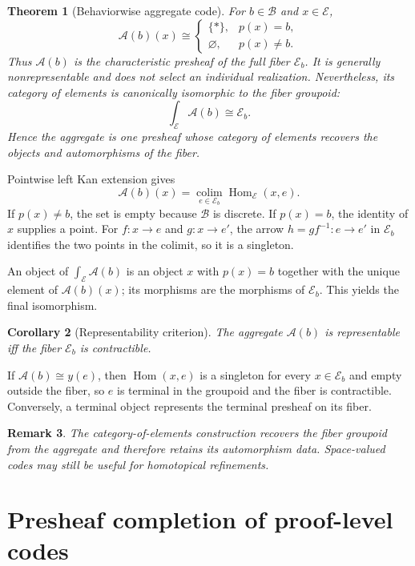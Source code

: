 \documentclass[12pt,a4paper,twoside]{extarticle}
\makeatletter
\theoremstyle{compactplain}
\newtheorem{theorem}{Theorem}[section]
\newtheorem{corollary}[theorem]{Corollary}
\theoremstyle{compactdef}
\newtheorem{remark}[theorem]{Remark}
\renewenvironment{proof}[1][\proofname]{\par\pushQED{\qed}\normalfont
  \topsep2pt\trivlist\item[\hskip\labelsep\bfseries #1\@addpunct{.}]\ignorespaces}
 {\popQED\endtrivlist\@endpefalse}
\newcommand{\Hom}{\operatorname{Hom}}
\newcommand{\colim}{\operatorname*{colim}}
\makeatother
\begin{document}
\begin{theorem}[Behaviorwise aggregate code]\label{thm:aggregate}
For $b\in\mathcal B$ and $x\in\mathcal E$,
\[
\mathcal A(b)(x)\cong
\begin{cases}
\{*\},&p(x)=b,\\
\varnothing,&p(x)\ne b.
\end{cases}
\]
Thus $\mathcal A(b)$ is the characteristic presheaf of the full fiber $\mathcal E_b$. It is generally nonrepresentable and does not select an individual realization. Nevertheless, its category of elements is canonically isomorphic to the fiber groupoid:
\[
\int_{\mathcal E}\mathcal A(b)\cong\mathcal E_b.
\]
Hence the aggregate is one presheaf whose category of elements recovers the objects and automorphisms of the fiber.
\end{theorem}
\begin{proof}
Pointwise left Kan extension gives
\[
\mathcal A(b)(x)=\colim_{e\in\mathcal E_b}\Hom_{\mathcal E}(x,e).
\]
If $p(x)\ne b$, the set is empty because $\mathcal B$ is discrete. If $p(x)=b$, the identity of $x$ supplies a point. For $f:x\to e$ and $g:x\to e'$, the arrow $h=gf^{-1}:e\to e'$ in $\mathcal E_b$ identifies the two points in the colimit, so it is a singleton.

An object of $\int_{\mathcal E}\mathcal A(b)$ is an object $x$ with $p(x)=b$ together with the unique element of $\mathcal A(b)(x)$; its morphisms are the morphisms of $\mathcal E_b$. This yields the final isomorphism.
\end{proof}

\begin{corollary}[Representability criterion]
The aggregate $\mathcal A(b)$ is representable iff the fiber $\mathcal E_b$ is contractible.
\end{corollary}
\begin{proof}
If $\mathcal A(b)\cong y(e)$, then $\Hom(x,e)$ is a singleton for every $x\in\mathcal E_b$ and empty outside the fiber, so $e$ is terminal in the groupoid and the fiber is contractible. Conversely, a terminal object represents the terminal presheaf on its fiber.
\end{proof}

\begin{remark}
The category-of-elements construction recovers the fiber groupoid from the aggregate and therefore retains its automorphism data. Space-valued codes may still be useful for homotopical refinements.
\end{remark}
\section{Presheaf completion of proof-level codes}
\end{document}
